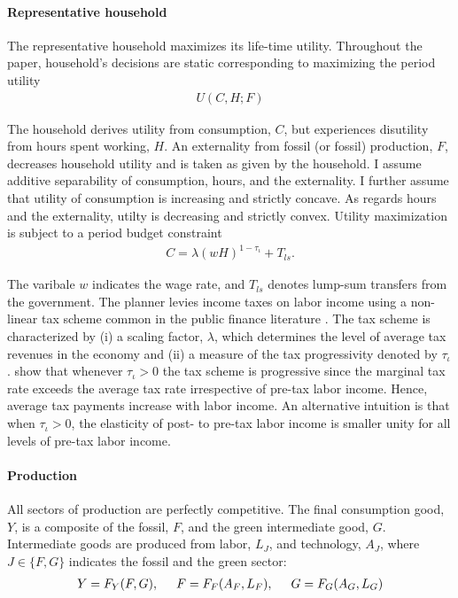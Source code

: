 \paragraph{Representative household}
The representative household maximizes its life-time utility. Throughout the paper, household's decisions are static corresponding to maximizing the period utility
\begin{align}
U(C,H; F)
\end{align} 

The household derives utility from consumption, $C$, but experiences disutility from hours spent working, $H$. An externality from fossil (or fossil) production, $F$, decreases household utility and is taken as given by the household.
I assume additive separability of consumption, hours, and the externality. I further assume that utility of consumption is increasing and strictly concave. As regards hours and the externality, utilty is decreasing and strictly convex.
Utility maximization is subject to a period budget constraint
\begin{align}
	 C= \lambda(wH)^{1-\tau_{\iota}}+T_{ls}. \label{eq:hhbudget}
\end{align}

The varibale $w$ indicates the wage rate, and $T_{ls}$ denotes lump-sum transfers from the government.
The planner levies income taxes on labor income using a non-linear tax scheme common in the public finance literature \citep{Heathcote2017OptimalFramework, Benabou2002TaxEfficiency}. The tax scheme is
characterized by (i) a scaling factor, $\lambda$, which determines the level of average tax revenues in the economy and (ii) a measure of the tax progressivity denoted by $\tau_{\iota}$. 
\cite{Heathcote2017OptimalFramework} show that whenever $\tau_{\iota}>0$ the tax scheme is progressive since the marginal tax rate exceeds the average tax rate irrespective of  pre-tax labor income. Hence, average tax payments increase with labor income. An alternative intuition is that when $\tau_{\iota}>0$, the elasticity of post- to pre-tax labor income is smaller unity for all levels of pre-tax labor income.  %

\paragraph{Production}
All sectors of production are perfectly competitive. The final consumption good, $Y$, is a composite of the fossil, $F$, and the green intermediate good, $G$. 
Intermediate goods are produced from labor, $L_J$, and technology, $A_J$, where $J\in \{F,G\}$ indicates the fossil and the green sector: 
\begin{align}
Y=F_Y(F, G), \hspace{5mm} F=F_F(A_F, L_F),\hspace{5mm} G=F_G(A_G, L_G) \label{eq:prod}
\end{align}

